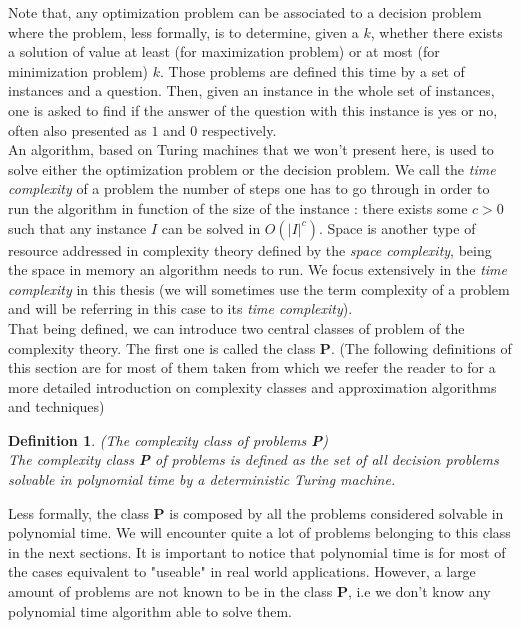 \documentclass[a4paper]{book}
\newtheorem{definition}{Definition}
\begin{document}
Note that, any optimization problem can be associated to a decision problem where the problem, less formally, is to determine, given a $k$, whether there exists a solution of value at least (for maximization problem) or at most (for minimization problem) $k$. Those problems are defined this time by a set of instances and a question. Then, given an instance in the whole set of instances, one is asked to find if the answer of the question with this instance is yes or no, often also presented as $1$ and $0$ respectively. \\

An algorithm, based on Turing machines that we won't present here, is used to solve either the optimization problem or the decision problem. We call the \textit{time complexity} of a problem the number of steps one has to go through in order to run the algorithm in function of the size of the instance : there exists some $c>0$ such that any instance $I$ can be solved in $O(|I|^c)$. Space is another type of resource addressed in complexity theory defined by the \textit{space complexity}, being the space in memory an algorithm needs to run. We focus extensively in the \textit{time complexity} in this thesis (we will sometimes use the term complexity of a problem and will be referring in this case to its \textit{time complexity}).\\




That being defined, we can introduce two central classes of problem of the complexity theory. 
The first one is called the class \textbf{P}. (The following definitions of this section are for most of them taken from \cite{escoffier2005approximation} which we reefer the reader to for a more detailed introduction on complexity classes and approximation algorithms and techniques)
\begin{definition}{\emph{(The complexity class of problems \textbf{P}) }}\\
The complexity class \emph{\textbf{P}} of problems is defined as the set of all decision problems solvable in polynomial time by a deterministic Turing machine.
\end{definition}

Less formally, the class \textbf{P} is composed by all the problems considered solvable in polynomial time. We will encounter quite a lot of problems belonging to this class in the next sections. It is important to notice that polynomial time is for most of the cases equivalent to "useable" in real world applications. However, a large amount of problems are not known to be in the class \textbf{P}, i.e we don't know any polynomial time algorithm able to solve them.  \\
\end{document}
